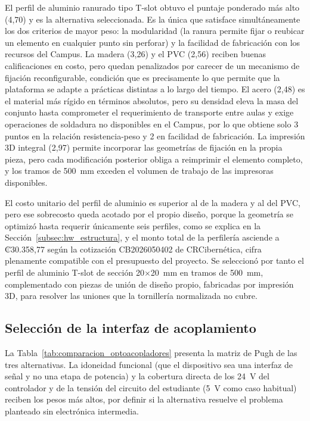 \documentclass[12pt,a4paper,oneside]{report}
\begin{document}
El perfil de aluminio ranurado tipo T-slot obtuvo el puntaje ponderado más alto (4{,}70) y es la alternativa seleccionada. Es la única que satisface simultáneamente los dos criterios de mayor peso: la modularidad (la ranura permite fijar o reubicar un elemento en cualquier punto sin perforar) y la facilidad de fabricación con los recursos del Campus. La madera (3{,}26) y el PVC (2{,}56) reciben buenas calificaciones en costo, pero quedan penalizados por carecer de un mecanismo de fijación reconfigurable, condición que es precisamente lo que permite que la plataforma se adapte a prácticas distintas a lo largo del tiempo. El acero (2{,}48) es el material más rígido en términos absolutos, pero su densidad eleva la masa del conjunto hasta comprometer el requerimiento de transporte entre aulas y exige operaciones de soldadura no disponibles en el Campus, por lo que obtiene solo 3 puntos en la relación resistencia-peso y 2 en facilidad de fabricación. La impresión 3D integral (2{,}97) permite incorporar las geometrías de fijación en la propia pieza, pero cada modificación posterior obliga a reimprimir el elemento completo, y los tramos de 500~mm exceden el volumen de trabajo de las impresoras disponibles.

El costo unitario del perfil de aluminio es superior al de la madera y al del PVC, pero ese sobrecosto queda acotado por el propio diseño, porque la geometría se optimizó hasta requerir únicamente seis perfiles, como se explica en la Sección~\ref{subsec:hw_estructura}, y el monto total de la perfilería asciende a ₡30.358{,}77 según la cotización CB2026050402 de CRCibernética, cifra plenamente compatible con el presupuesto del proyecto. Se seleccionó por tanto el perfil de aluminio T-slot de sección 20$\times$20~mm en tramos de 500~mm, complementado con piezas de unión de diseño propio, fabricadas por impresión 3D, para resolver las uniones que la tornillería normalizada no cubre.

\subsection{Selección de la interfaz de acoplamiento}
\label{subsec:seleccion_opto}

La Tabla~\ref{tab:comparacion_optoacopladores} presenta la matriz de Pugh de las tres alternativas. La idoneidad funcional (que el dispositivo sea una interfaz de señal y no una etapa de potencia) y la cobertura directa de los 24~V del controlador y de la tensión del circuito del estudiante (5~V como caso habitual) reciben los pesos más altos, por definir si la alternativa resuelve el problema planteado sin electrónica intermedia.
\end{document}
